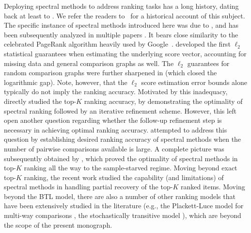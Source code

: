  Deploying spectral methods to address ranking tasks has a long history, dating back at least to \citet{seeley1949net}. We refer the readers to~\citet{vigna2016spectral} for a historical account of this subject. The specific instance of spectral methods  introduced here was due to \citet{negahban2016rank}, and has been subsequently analyzed in multiple papers \citep{rajkumar2014statistical,chen2015spectral,jang2016top,chen2020partial}. It bears close similarity to the celebrated PageRank algorithm heavily used by Google~\citep{page1999pagerank}.  \citet{negahban2016rank} developed the first $\ell_{2}$ statistical guarantees when estimating the underlying score vector, accounting for missing data and general comparison graphs as well. The $\ell_2$ guarantees for random comparison graphs were further sharpened in \citet{chen2015spectral} (which  closed the logarithmic gap).
Note, however, that the $\ell_2$ score estimation error bounds alone typically do not imply the ranking accuracy. Motivated by this inadequacy, \citet{chen2015spectral} directly studied the top-$K$ ranking accuracy, by demonstrating the  optimality of spectral ranking followed by an iterative refinement scheme.
However, this left open another question regarding whether the follow-up refinement step is necessary in achieving optimal ranking accuracy.
\citet{jang2016top} attempted to address this question by establishing desired ranking accuracy of spectral methods when the number of pairwise comparisons available is large. A complete picture was subsequently obtained by \citet{chen2017spectral}, which proved the optimality of spectral methods  in top-$K$ ranking all the way to the sample-starved regime. Moving beyond exact top-$K$ ranking, the recent work \citet{chen2020partial} studied the capability (and limitations) of spectral methods in handling
partial recovery of the top-$K$ ranked items. Moving beyond the BTL model, there are also a number of other ranking models that have been extensively studied in the literature (e.g., the Plackett-Luce model for multi-way comparisons \citep{hunter2004mm,hajek2014minimax,oh2014learning,agarwal2018accelerated}, the stochastically transitive model \citep{shah2016stochastically,shah2019feeling}), which are beyond the scope of the present monograph.
















